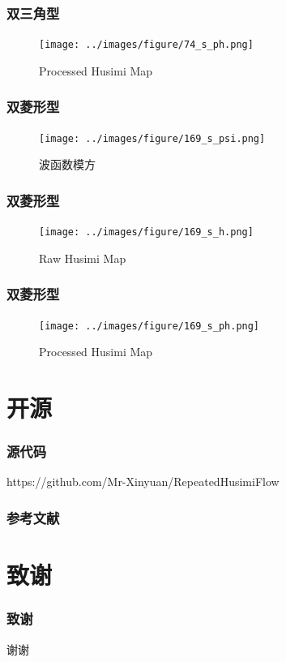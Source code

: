 \documentclass[UTF8]{beamer}
\begin{document}
\begin{frame}
    \frametitle{双三角型}
    \begin{figure}
        \centering
        \texttt{[image: ../images/figure/74\_s\_ph.png]}
        \caption{Processed Husimi Map}
    \end{figure}
\end{frame}

\begin{frame}
    \frametitle{双菱形型}
    \begin{figure}
        \centering
        \texttt{[image: ../images/figure/169\_s\_psi.png]}
        \caption{波函数模方}
    \end{figure}
\end{frame}

\begin{frame}
    \frametitle{双菱形型}
    \begin{figure}
        \centering
        \texttt{[image: ../images/figure/169\_s\_h.png]}
        \caption{Raw Husimi Map}
    \end{figure}
\end{frame}

\begin{frame}
    \frametitle{双菱形型}
    \begin{figure}
        \centering
        \texttt{[image: ../images/figure/169\_s\_ph.png]}
        \caption{Processed Husimi Map}
    \end{figure}
\end{frame}

\section*{开源}
\begin{frame}
    \frametitle{源代码}
        https://github.com/Mr-Xinyuan/RepeatedHusimiFlow
\end{frame}

\begin{frame}
    \frametitle{参考文献}
    
\end{frame}


\section*{致谢}
\begin{frame}
    \frametitle{致谢}
    \begin{center}
        \Huge 谢谢
    \end{center}
\end{frame}
\end{document}
